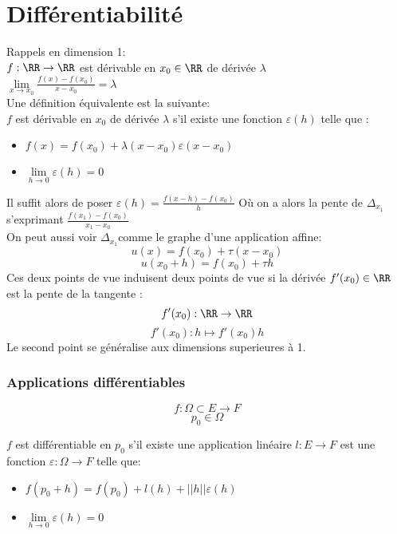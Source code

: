 \documentclass[../main.tex]{subfile}
\begin{document}
\part{Différentiabilité}
\begin{rap}
	Rappels en dimension 1:\\
	$f : \RR \to \RR$ est dérivable en $x_0 \in \RR$ de dérivée $\lambda$\\
	$\lim\limits_{x \to x_0} \frac{f(x) - f(x_0)}{x - x_0} = \lambda$\\

	Une définition équivalente est la suivante:\\
	$f$ est dérivable en $x_0$ de dérivée $\lambda$ s'il existe une fonction $\varepsilon(h)$ telle que :\\
\begin{itemize}	
	\item $f(x) = f(x_0) + \lambda(x-x_0)\varepsilon(x-x_0)$
	\item $\lim\limits_{h \to 0} \varepsilon(h) = 0$
\end{itemize}
	Il suffit alors de poser $\varepsilon(h) = \frac{f(x-h) - f(x_0)}{h}$
	Où on a alors la pente de $\Delta_{x_1}$ s'exprimant $\frac{f(x_1) - f(x_0)}{x_1 - x_0}$\\
	On peut aussi voir $\Delta_{x_1}$comme le graphe d'une application affine:
	$$u(x) = f(x_0) + \tau(x-x_0)$$
	$$u(x_0+h) = f(x_0) + \tau h$$
	Ces deux points de vue induisent deux points de vue si la dérivée $f'(x_0) \in \RR$ est la pente de la tangente :
	$$f'(x_0) : \RR \to \RR$$
	$$f'(x_0) : h \mapsto f'(x_0) h$$
	Le second point se généralise aux dimensions superieures à 1.
\end{rap}

\section{Applications différentiables}
$$f : \Omega \subset E \to F$$
$$p_0 \in \Omega$$

\begin{defi}
	$f$ est différentiable en $p_0$ s'il existe une application linéaire $l : E \to F$ est une fonction $\varepsilon : \Omega \to F$ telle que:
\begin{itemize}	
	\item $f(p_0 + h) = f(p_0) + l(h) + ||h|| \varepsilon (h)$
	\item $\lim\limits_{h \to 0} \varepsilon (h) = 0$
\end{itemize}
\end{defi}
\end{document}
